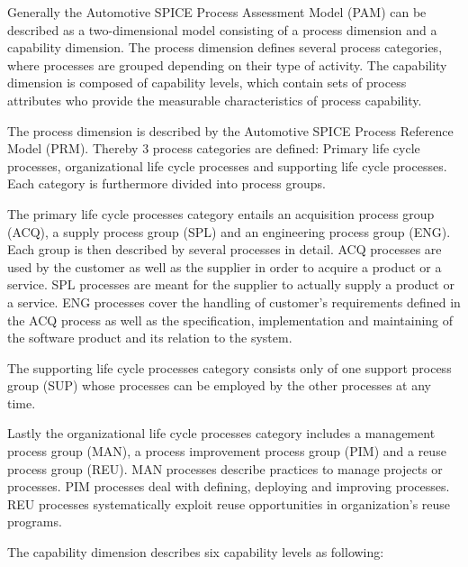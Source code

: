 Generally the Automotive SPICE Process Assessment Model (PAM) can be described as a two-dimensional model consisting of a process dimension 
and a capability dimension. The process dimension defines several process categories, where processes are grouped depending on their type of 
activity. The capability dimension is composed of capability levels, which contain sets of process attributes who provide the measurable 
characteristics of process capability.

The process dimension is described by the Automotive SPICE Process Reference Model (PRM). Thereby 3 process categories are defined: Primary life
cycle processes, organizational life cycle processes and supporting life cycle processes. Each category is furthermore divided into process groups.

The primary life cycle processes category entails an acquisition process group (ACQ), a supply process group (SPL) and an engineering process 
group (ENG). Each group is then described by several processes in detail. ACQ processes are used by the customer as well as the supplier in 
order to acquire a product or a service. SPL processes are meant for the supplier to actually supply a product or a service. ENG processes 
cover the handling of customer’s requirements defined in the ACQ process as well as the specification, implementation and maintaining of the 
software product and its relation to the system.

The supporting life cycle processes category consists only of one support process group (SUP) whose processes can be employed by the other processes at any time.

Lastly the organizational life cycle processes category includes a management process group (MAN), a process improvement process group (PIM) 
and a reuse process group (REU). MAN processes describe practices to manage projects or processes. PIM processes deal with defining, deploying 
and improving processes. REU processes systematically exploit reuse opportunities in organization’s reuse programs.

The capability dimension describes six capability levels as following:

